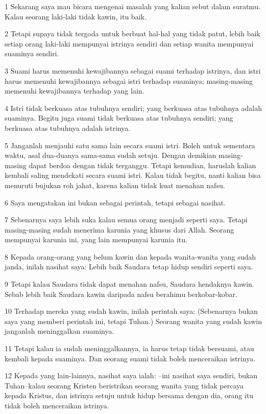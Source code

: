 \par 1 Sekarang saya mau bicara mengenai masalah yang kalian sebut dalam suratmu. Kalau seorang laki-laki tidak kawin, itu baik.
\par 2 Tetapi supaya tidak tergoda untuk berbuat hal-hal yang tidak patut, lebih baik setiap orang laki-laki mempunyai istrinya sendiri dan setiap wanita mempunyai suaminya sendiri.
\par 3 Suami harus memenuhi kewajibannya sebagai suami terhadap istrinya, dan istri harus memenuhi kewajibannya sebagai istri terhadap suaminya; masing-masing memenuhi kewajibannya terhadap yang lain.
\par 4 Istri tidak berkuasa atas tubuhnya sendiri; yang berkuasa atas tubuhnya adalah suaminya. Begitu juga suami tidak berkuasa atas tubuhnya sendiri; yang berkuasa atas tubuhnya adalah istrinya.
\par 5 Janganlah menjauhi satu sama lain secara suami istri. Boleh untuk sementara waktu, asal dua-duanya sama-sama sudah setuju. Dengan demikian masing-masing dapat berdoa dengan tidak terganggu. Tetapi kemudian, haruslah kalian kembali saling mendekati secara suami istri. Kalau tidak begitu, nanti kalian bisa menuruti bujukan roh jahat, karena kalian tidak kuat menahan nafsu.
\par 6 Saya mengatakan ini bukan sebagai perintah, tetapi sebagai nasihat.
\par 7 Sebenarnya saya lebih suka kalau semua orang menjadi seperti saya. Tetapi masing-masing sudah menerima karunia yang khusus dari Allah. Seorang mempunyai karunia ini, yang lain mempunyai karunia itu.
\par 8 Kepada orang-orang yang belum kawin dan kepada wanita-wanita yang sudah janda, inilah nasihat saya: Lebih baik Saudara tetap hidup sendiri seperti saya.
\par 9 Tetapi kalau Saudara tidak dapat menahan nafsu, Saudara hendaknya kawin. Sebab lebih baik Saudara kawin daripada nafsu berahimu berkobar-kobar.
\par 10 Terhadap mereka yang sudah kawin, inilah perintah saya: (Sebenarnya bukan saya yang memberi perintah ini, tetapi Tuhan.) Seorang wanita yang sudah kawin janganlah meninggalkan suaminya.
\par 11 Tetapi kalau ia sudah meninggalkannya, ia harus tetap tidak bersuami, atau kembali kepada suaminya. Dan seorang suami tidak boleh menceraikan istrinya.
\par 12 Kepada yang lain-lainnya, nasihat saya ialah: --ini nasihat saya sendiri, bukan Tuhan--kalau seorang Kristen beristrikan seorang wanita yang tidak percaya kepada Kristus, dan istrinya setuju untuk hidup bersama dengan dia, orang itu tidak boleh menceraikan istrinya.
